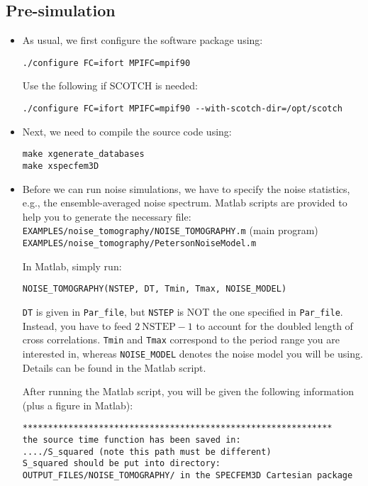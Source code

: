 \subsection{Pre-simulation}
\begin{itemize}
\item As usual, we first configure the software package using:
\begin{verbatim}
./configure FC=ifort MPIFC=mpif90
\end{verbatim}

Use the following if SCOTCH is needed:
\begin{verbatim}
./configure FC=ifort MPIFC=mpif90 --with-scotch-dir=/opt/scotch
\end{verbatim}

\item Next, we need to compile the source code using:
\begin{verbatim}
make xgenerate_databases
make xspecfem3D
\end{verbatim}

\item Before we can run noise simulations, we have to specify the noise
statistics, e.g., the ensemble-averaged noise spectrum. Matlab scripts
are provided to help you to generate the necessary file:
\texttt{EXAMPLES/noise\_tomography/NOISE\_TOMOGRAPHY.m} (main program)\\
\texttt{EXAMPLES/noise\_tomography/PetersonNoiseModel.m}

In Matlab, simply run:
\begin{verbatim}
NOISE_TOMOGRAPHY(NSTEP, DT, Tmin, Tmax, NOISE_MODEL)
\end{verbatim}

\texttt{DT} is given in \texttt{Par\_file}, but \texttt{NSTEP} is
NOT the one specified in \texttt{Par\_file}. Instead, you have to
feed $2~\mathrm{NSTEP}-1$ to account for the doubled length of cross
correlations. \texttt{Tmin} and \texttt{Tmax} correspond to the period
range you are interested in, whereas \texttt{NOISE\_MODEL} denotes
the noise model you will be using. Details can be found in the Matlab
script.


After running the Matlab script, you will be given the following information
(plus a figure in Matlab):
\begin{verbatim}
*************************************************************
the source time function has been saved in:
..../S_squared (note this path must be different)
S_squared should be put into directory:
OUTPUT_FILES/NOISE_TOMOGRAPHY/ in the SPECFEM3D Cartesian package
\end{verbatim}


\end{itemize}
